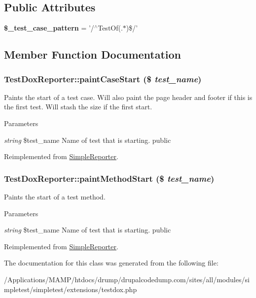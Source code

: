 \subsection*{Public Attributes}
\begin{DoxyCompactItemize}
\item 
\hypertarget{class_test_dox_reporter_aa394fd15e2f982e9ef2bac5b613b1df4}{
{\bfseries \$\_\-test\_\-case\_\-pattern} = '/$^\wedge$TestOf(.$\ast$)\$/'}
\label{class_test_dox_reporter_aa394fd15e2f982e9ef2bac5b613b1df4}

\end{DoxyCompactItemize}


\subsection{Member Function Documentation}
\hypertarget{class_test_dox_reporter_a0675ceed8813548f9d1bafc71c794f24}{
\subsubsection[{paintCaseStart}]{\setlength{\rightskip}{0pt plus 5cm}TestDoxReporter::paintCaseStart (\$ {\em test\_\-name})}}
\label{class_test_dox_reporter_a0675ceed8813548f9d1bafc71c794f24}
Paints the start of a test case. Will also paint the page header and footer if this is the first test. Will stash the size if the first start. 
\begin{DoxyParams}{Parameters}
\item[{\em string}]\$test\_\-name Name of test that is starting.  public \end{DoxyParams}


Reimplemented from \hyperlink{class_simple_reporter_a987d5bbfa2cc927da394f6bc6053c23e}{SimpleReporter}.\hypertarget{class_test_dox_reporter_a1d7d83c7832d12c8626245ec38b80a96}{
\subsubsection[{paintMethodStart}]{\setlength{\rightskip}{0pt plus 5cm}TestDoxReporter::paintMethodStart (\$ {\em test\_\-name})}}
\label{class_test_dox_reporter_a1d7d83c7832d12c8626245ec38b80a96}
Paints the start of a test method. 
\begin{DoxyParams}{Parameters}
\item[{\em string}]\$test\_\-name Name of test that is starting.  public \end{DoxyParams}


Reimplemented from \hyperlink{class_simple_reporter_a54672d58e0fad0e0e672159dd4f61124}{SimpleReporter}.

The documentation for this class was generated from the following file:\begin{DoxyCompactItemize}
\item 
/Applications/MAMP/htdocs/drump/drupalcodedump.com/sites/all/modules/simpletest/simpletest/extensions/testdox.php\end{DoxyCompactItemize}
